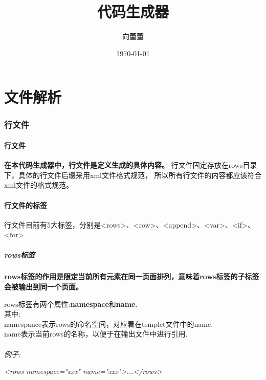 \documentclass[UTF8]{ctexart}
\author{向董董}
\title{代码生成器}
\date{\today}
\begin{document}
\setlength{\parindent}{2em}
\maketitle
\newpage
\tableofcontents
\newpage

\part{文件解析}
    \section{行文件}
        \subsection{行文件}

            \par{\textbf{在本代码生成器中，行文件是定义生成的具体内容。}
            行文件固定存放在rows目录下，具体的行文件后缀采用xml文件格式规范，
            所以所有行文件的内容都应该符合xml文件的格式规范。}

            \subsection{行文件的标签}
            \par{行文件目前有5大标签，分别是<rows>、<row>、<append>、<var>、<if>、<for>}
            \\
            \subsubsection{rows标签}
                \par\textbf{rows标签的作用是限定当前所有元素在同一页面排列，意味着rows标签的子标签会被输出到同一个页面。
                }
                \par rows标签有两个属性:\textbf{namespace}和\textbf{name}.
                \\ 其中:
                \\
                \indent namespance表示rows的命名空间，对应着在templet文件中的name.
                \\
                \indent name表示当前rows的名称，以便于在输出文件中进行引用.
                \\\\
                \emph{{例子:}}
                \par\emph{<rows namespace="xxx" name="xxx">...</rows>}
\end{document}
